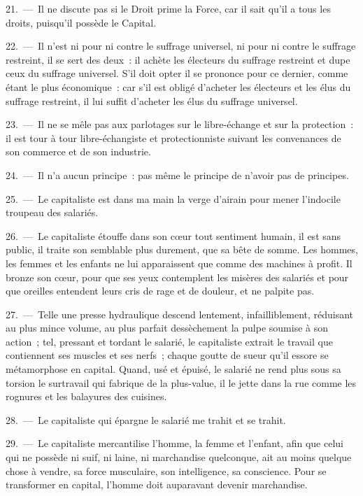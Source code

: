 \documentclass[french,twoside]{book} %
\begin{document}
21. — Il ne discute pas si le Droit prime la Force, car il sait qu’il a tous les droits, puisqu’il possède le Capital.\par
22. — Il n’est ni pour ni contre le suffrage universel, ni pour ni contre le suffrage restreint, il se sert des deux : il achète les électeurs du suffrage restreint et dupe ceux du suffrage universel. S'il doit opter il se prononce pour ce dernier, comme étant le plus économique : car s’il est obligé d’acheter les électeurs et les élus du suffrage restreint, il lui suffit d’acheter les élus du suffrage universel.\par
23. — Il ne se mêle pas aux parlotages sur le libre-échange et sur la protection : il est tour à tour libre-échangiste et protectionniste suivant les convenances de son commerce et de son industrie.\par
24. — Il n’a aucun principe : pas même le principe de n’avoir pas de principes.\par
25. — Le capitaliste est dans ma main la verge d’airain pour mener l’indocile troupeau des salariés.\par
26. — Le capitaliste étouffe dans son cœur tout sentiment humain, il est sans public, il traite son semblable plus durement, que sa bête de somme. Les hommes, les femmes et les enfants ne lui apparaissent que comme des machines à profit. Il bronze son cœur, pour que ses yeux contemplent les misères des salariés et pour que oreilles entendent leurs cris de rage et de douleur, et ne palpite pas.\par
27. — Telle une presse hydraulique descend lentement, infailliblement, réduisant au plus mince volume, au plus parfait dessèchement la pulpe soumise à son action ; tel, pressant et tordant le salarié, le capitaliste extrait le travail que contiennent ses muscles et ses nerfs ; chaque goutte de sueur qu’il essore se métamorphose en capital. Quand, usé et épuisé, le salarié ne rend plus sous sa torsion le surtravail qui fabrique de la plus-value, il le jette dans la rue comme les rognures et les balayures des cuisines.\par
28. — Le capitaliste qui épargne le salarié me trahit et se trahit.\par
29. — Le capitaliste mercantilise l’homme, la femme et l’enfant, afin que celui qui ne possède ni suif, ni laine, ni marchandise quelconque, ait au moins quelque chose à vendre, sa force musculaire, son intelligence, sa conscience. Pour se transformer en capital, l’homme doit auparavant devenir marchandise.\par
\end{document}
